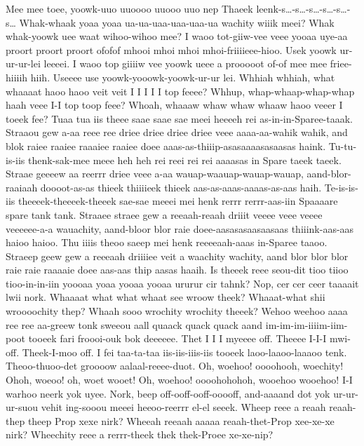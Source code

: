 \documentclass[12pt,a4paper]{article}
\begin{document}
\begin{drama}
\pistspeaks
Mee mee toee, yoowk-uuo uuoooo uuooo uuo nep Thaeek leenk-s…-s…-s…-s…-s…-s…
\metospeaks
Whak-whaak yoaa yoaa ua-ua-uaa-uaa-uaa-ua wachity wiiik meei? Whak whak-yoowk uee waat wihoo-wihoo mee?
\pistspeaks
I waoo tot-giiw-vee veee yooaa uye-aa proort proort proort ofofof mhooi mhoi mhoi mhoi-friiiieee-hioo. Usek yoowk ur-ur-ur-lei leeeei. I waoo top giiiiw vee yoowk ueee a prooooot of-of mee mee friee-hiiiih hiih. Useeee use yoowk-yooowk-yoowk-ur-ur lei.
\metospeaks
Whhiah whhiah, what whaaaat haoo haoo veit veit I I I I I top feeee? Whhup, whap-whaap-whap-whap haah veee I-I top toop feee? Whoah, whaaaw whaw whaw whaaw haoo veeer I toeek fee?
\pistspeaks
Tuaa tua iis theee saae saae sae meei heeeeh rei as-in-in-Sparee-taaak. Straaou gew a-aa reee ree driee driee driee driee veee aaaa-aa-wahik wahik, and blok raiee raaiee raaaiee raaiee doee aaas-as-thiiip-asasaaaasasaasas haink. Tu-tu-is-iis thenk-sak-mee meee heh heh rei reei rei rei aaaasas in Spare taeek taeek. Straae geeeew aa reerrr driee veee a-aa wauap-waauap-wauap-wauap, aand-blor-raaiaah doooot-as-as thieek thiiiieek thieek aas-as-aaas-aaaas-as-aas haih. Te-is-is-iis theeeek-theeeek-theeek sae-sae meeei mei henk rerrr rerrr-aas-iin Spaaaare spare tank tank. Straaee straee gew a reeaah-reaah driiit veeee veee veeee veeeeee-a-a wauachity, aand-bloor blor raie doee-aasasasaasaasaas thiiink-aas-aas haioo haioo. Thu iiiis theoo saeep mei henk reeeeaah-aaas in-Sparee taaoo. Straeep geew gew a reeeaah driiiiee veit a waachity wachity, aand blor blor blor raie raie raaaaie doee aas-aas thip aasas haaih.
\metospeaks
Is theeek reee seou-dit tioo tiioo tioo-in-in-iin yoooaa yoaa yooaa yooaa ururur cir tahnk?
\pistspeaks
Nop, cer cer ceer taaaait lwii nork.
\metospeaks
Whaaaat what what whaat see wroow theek? Whaaat-what shii wroooochity thep? Whaah sooo wrochity wrochity theeek?
\pistspeaks
Wehoo weehoo aaaa ree ree aa-greew tonk sweeou aall quaack quack quack aand im-im-im-iiiim-iim-poot tooeek fari froooi-ouk bok deeeeee.
\metospeaks
Thet I I I myeeee off. Theeee I-I-I mwi-off. Theek-I-moo off.
\pistspeaks
I fei taa-ta-taa iis-iis-iiis-iis tooeek laoo-laaoo-laaaoo tenk. Theoo-thuoo-det groooow aalaal-reeee-duot.  
\metospeaks
Oh, woehoo! oooohooh, woechity! Ohoh, woeoo! oh, woet wooet! Oh, woehoo! oooohohohoh, wooehoo wooehoo!
\pistspeaks
I-I warhoo neerk yok uyee. Nork, beep off-ooff-ooff-ooooff, and-aaaand dot yok ur-ur-ur-suou vehit ing-sooou meeei heeoo-reerrr el-el seeek.  
\anspspeaks
Wheep reee a reaah reaah-thep theep Prop xexe nirk? Wheeah reeaah aaaaa reaah-thet-Prop xee-xe-xe nirk? Wheechity reee a rerrr-theek thek thek-Proee xe-xe-nip?

\end{drama}
\end{document}
